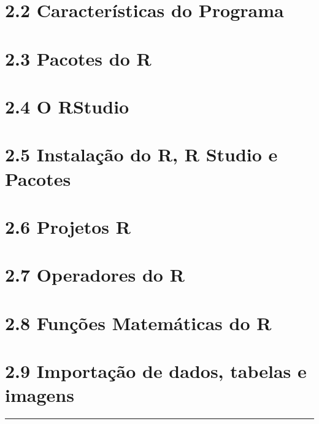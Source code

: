 \documentclass[
]{book}
\theoremstyle{definition}
\theoremstyle{definition}
\theoremstyle{definition}
\theoremstyle{definition}
\theoremstyle{remark}
\begin{document}
\hypertarget{caracteruxedsticas-do-programa}{%
\section{2.2 Características do Programa}\label{caracteruxedsticas-do-programa}}

\hypertarget{pacotes-do-r}{%
\section{2.3 Pacotes do R}\label{pacotes-do-r}}

\hypertarget{o-rstudio}{%
\section{2.4 O RStudio}\label{o-rstudio}}

\hypertarget{instalauxe7uxe3o-do-r-r-studio-e-pacotes}{%
\section{2.5 Instalação do R, R Studio e Pacotes}\label{instalauxe7uxe3o-do-r-r-studio-e-pacotes}}

\hypertarget{projetos-r}{%
\section{2.6 Projetos R}\label{projetos-r}}

\hypertarget{operadores-do-r}{%
\section{2.7 Operadores do R}\label{operadores-do-r}}

\hypertarget{funuxe7uxf5es-matemuxe1ticas-do-r}{%
\section{2.8 Funções Matemáticas do R}\label{funuxe7uxf5es-matemuxe1ticas-do-r}}

\hypertarget{importauxe7uxe3o-de-dados-tabelas-e-imagens}{%
\section{2.9 Importação de dados, tabelas e imagens}\label{importauxe7uxe3o-de-dados-tabelas-e-imagens}}

\begin{center}\rule{0.5\linewidth}{0.5pt}\end{center}
\end{document}

